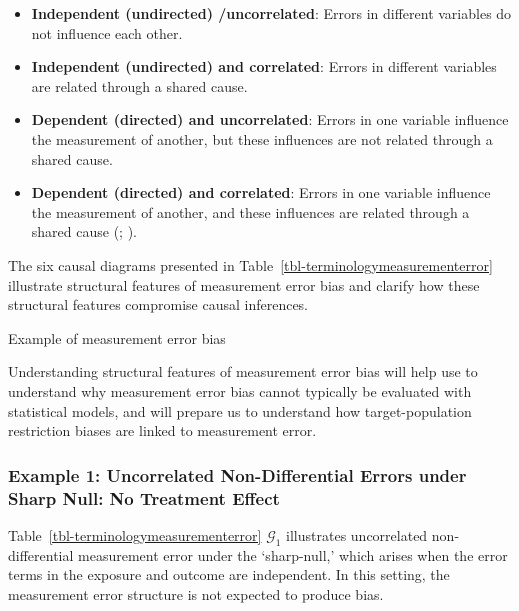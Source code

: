 \documentclass[
  single column]{article}
\providecommand{\tightlist}{%
  \setlength{\itemsep}{0pt}\setlength{\parskip}{0pt}}\usepackage{longtable,booktabs,array}
\begin{document}
\begin{itemize}
\tightlist
\item
  \textbf{Independent (undirected) /uncorrelated}: Errors in different
  variables do not influence each other.
\item
  \textbf{Independent (undirected) and correlated}: Errors in different
  variables are related through a shared cause.
\item
  \textbf{Dependent (directed) and uncorrelated}: Errors in one variable
  influence the measurement of another, but these influences are not
  related through a shared cause.
\item
  \textbf{Dependent (directed) and correlated}: Errors in one variable
  influence the measurement of another, and these influences are related
  through a shared cause (; ).
\end{itemize}

The six causal diagrams presented in
Table~\ref{tbl-terminologymeasurementerror} illustrate structural
features of measurement error bias and clarify how these structural
features compromise causal inferences.

\begin{table}

\caption{\label{tbl-terminologymeasurementerror}Example of measurement
error bias}

\centering{

\terminologymeasurementerror

}

\end{table}%

Understanding structural features of measurement error bias will help
use to understand why measurement error bias cannot typically be
evaluated with statistical models, and will prepare us to understand how
target-population restriction biases are linked to measurement error.

\subsubsection{Example 1: Uncorrelated Non-Differential Errors under
Sharp Null: No Treatment
Effect}\label{example-1-uncorrelated-non-differential-errors-under-sharp-null-no-treatment-effect}

Table~\ref{tbl-terminologymeasurementerror} \(\mathcal{G}_1\)
illustrates uncorrelated non-differential measurement error under the
`sharp-null,' which arises when the error terms in the exposure and
outcome are independent. In this setting, the measurement error
structure is not expected to produce bias.
\end{document}
